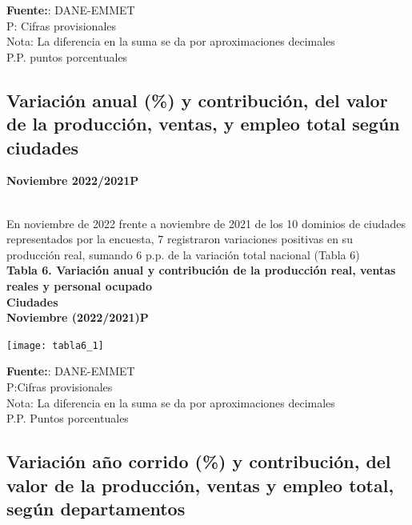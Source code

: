 \documentclass[
]{article}
\begin{document}
\textbf{Fuente:}: DANE-EMMET\\
P: Cifras provisionales\\
Nota: La diferencia en la suma se da por aproximaciones decimales\\
P.P. puntos porcentuales

\hypertarget{variaciuxf3n-anual-y-contribuciuxf3n-del-valor-de-la-producciuxf3n-ventas-y-empleo-total-seguxfan-ciudades}{%
\subsection{Variación anual (\%) y contribución, del valor de la
producción, ventas, y empleo total según
ciudades}\label{variaciuxf3n-anual-y-contribuciuxf3n-del-valor-de-la-producciuxf3n-ventas-y-empleo-total-seguxfan-ciudades}}

\textbf{Noviembre 2022/2021P}\\
\strut \\
En noviembre de 2022 frente a noviembre de 2021 de los 10 dominios de
ciudades representados por la encuesta, 7 registraron variaciones
positivas en su producción real, sumando 6 p.p. de la variación total
nacional (Tabla 6)\\
\textbf{Tabla 6. Variación anual y contribución de la producción real,
ventas reales y personal ocupado}\\
\textbf{Ciudades}\\
\textbf{Noviembre  (2022/2021)P}

\begin{center}\texttt{[image: tabla6\_1]} \end{center}

\textbf{Fuente:}: DANE-EMMET\\
P:Cifras provisionales\\
Nota: La diferencia en la suma se da por aproximaciones decimales\\
P.P. Puntos porcentuales\\

\hypertarget{variaciuxf3n-auxf1o-corrido-y-contribuciuxf3n-del-valor-de-la-producciuxf3n-ventas-y-empleo-total-seguxfan-departamentos}{%
\subsection{Variación año corrido (\%) y contribución, del valor de la
producción, ventas y empleo total, según
departamentos}\label{variaciuxf3n-auxf1o-corrido-y-contribuciuxf3n-del-valor-de-la-producciuxf3n-ventas-y-empleo-total-seguxfan-departamentos}}
\end{document}
